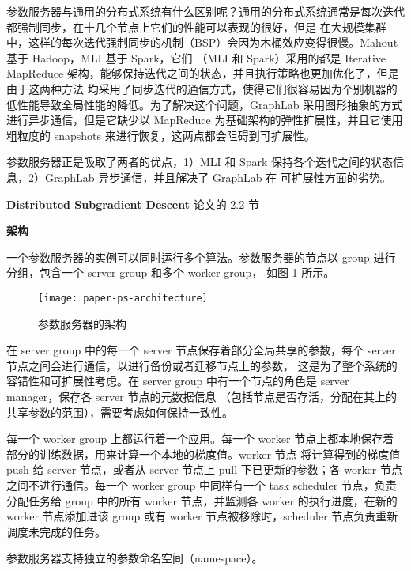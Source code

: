 参数服务器与通用的分布式系统有什么区别呢？通用的分布式系统通常是每次迭代都强制同步，在十几个节点上它们的性能可以表现的很好，但是
在大规模集群中，这样的每次迭代强制同步的机制（BSP）会因为木桶效应变得很慢。Mahout 基于 Hadoop，MLI 基于 Spark，它们
（MLI 和 Spark）采用的都是 Iterative MapReduce 架构，能够保持迭代之间的状态，并且执行策略也更加优化了，但是由于这两种方法
均采用了同步迭代的通信方式，使得它们很容易因为个别机器的低性能导致全局性能的降低。为了解决这个问题，GraphLab 采用图形抽象的方式
进行异步通信，但是它缺少以 MapReduce 为基础架构的弹性扩展性，并且它使用粗粒度的 snapshots 来进行恢复，这两点都会阻碍到可扩展性。

参数服务器正是吸取了两者的优点，1）MLI 和 Spark 保持各个迭代之间的状态信息，2）GraphLab 异步通信，并且解决了 GraphLab 在
可扩展性方面的劣势。

\noindent\textbf{Distributed Subgradient Descent} 论文的 2.2 节 %

\noindent\textbf{架构}

一个参数服务器的实例可以同时运行多个算法。参数服务器的节点以 group 进行分组，包含一个 server group 和多个 worker group，
如图 \ref{fig:paper-ps-architecture} 所示。

\begin{figure}[hbtp]
\centering
\texttt{[image: paper-ps-architecture]}
\caption{参数服务器的架构}
\label{fig:paper-ps-architecture}
\end{figure}

在 server group 中的每一个 server 节点保存着部分全局共享的参数，每个 server 节点之间会进行通信，以进行备份或者迁移节点上的参数，
这是为了整个系统的容错性和可扩展性考虑。在 server group 中有一个节点的角色是 server manager，保存各 server 节点的元数据信息
（包括节点是否存活，分配在其上的共享参数的范围），需要考虑如何保持一致性。

每一个 worker group 上都运行着一个应用。每一个 worker 节点上都本地保存着部分的训练数据，用来计算一个本地的梯度值。worker 节点
将计算得到的梯度值 push 给 server 节点，或者从 server 节点上 pull 下已更新的参数；各 worker 节点之间不进行通信。每一个 worker
group 中同样有一个 task scheduler 节点，负责分配任务给 group 中的所有 worker 节点，并监测各 worker 的执行进度，在新的 worker
节点添加进该 group 或有 worker 节点被移除时，scheduler 节点负责重新调度未完成的任务。

参数服务器支持独立的参数命名空间（namespace）。

